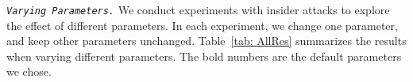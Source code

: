 

\noindent 
\textit{\texttt{Varying Parameters.}}
%
We conduct experiments with insider attacks to explore the effect of different parameters. In each experiment, we change one parameter, and keep other parameters unchanged. %
Table~\ref{tab: AllRes} summarizes the results when varying different parameters. The bold numbers are the default parameters we chose.


